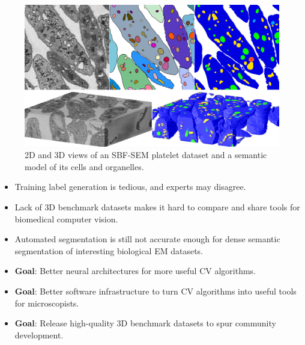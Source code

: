 \documentclass[final]{beamer}
\newlength{\onecolwid}
\renewcommand{\emph}[1]{{\color{nibib2} #1}}
\begin{document}
\begin{frame}[t]
\begin{columns}[t]
\begin{column}{\onecolwid}
    \begin{center}
        \begin{figure}
            \includegraphics[width=\linewidth]{fig/intronew.png}
            \caption{2D and 3D views of an SBF-SEM platelet dataset and a semantic model of its cells and organelles.}
        \end{figure}
    \end{center}
    
    \begin{tcolorbox}[title=Challenges]
        \begin{itemize}
            \item Training \emph{label generation} is tedious, and experts may disagree.
            \item Lack of \emph{3D benchmark datasets} makes it hard to compare and share tools for biomedical computer vision.  %
            \item Automated segmentation is still \emph{not accurate enough} for dense semantic segmentation of interesting biological EM datasets.
            \item \textbf{Goal}: Better \emph{neural architectures} for more useful CV algorithms. 
            \item \textbf{Goal}: Better \emph{software infrastructure} to turn CV algorithms into useful tools for microscopists.
            \item \textbf{Goal}: Release high-quality \emph{3D benchmark datasets} to spur community development.
        \end{itemize}
    \end{tcolorbox}

\end{column} 



\end{columns}
\end{frame}
\end{document}
